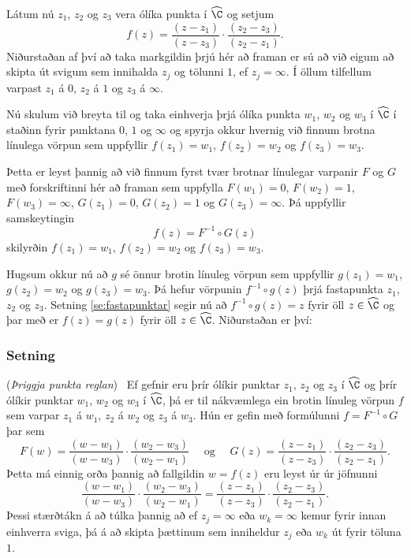 Látum nú $z_1$, $z_2$ og $z_3$ vera ólíka punkta í $\widehat \C$ og
setjum
$$
f(z)=\dfrac{(z-z_1)}{(z-z_3)}\cdot \dfrac{(z_2-z_3)}{(z_2-z_1)}.
$$
Niðurstaðan af því að taka markgildin þrjú hér að framan er sú að við
eigum að skipta  út svigum sem innihalda $z_j$ og tölunni $1$,
ef $z_j=\infty$.  Í öllum tilfellum varpast $z_1$ á $0$, $z_2$ á 
$1$ og $z_3$ á $\infty$.

Nú skulum við breyta til og taka einhverja þrjá ólíka punkta $w_1$,
$w_2$ og $w_3$ í $\widehat \C$  í staðinn fyrir punktana $0$, $1$ 
og $\infty$ og spyrja okkur hvernig við finnum brotna línulega vörpun
sem uppfyllir $f(z_1)=w_1$, $f(z_2)=w_2$ og $f(z_3)=w_3$.  

Þetta er leyst þannig að við finnum fyrst tvær brotnar línulegar
varpanir $F$ og $G$ með forskriftinni hér að framan sem uppfylla
$F(w_1)=0$, $F(w_2)=1$, $F(w_3)=\infty$, $G(z_1)=0$, $G(z_2)=1$ og 
$G(z_3)=\infty$.  Þá uppfyllir samskeytingin
$$
f(z)=F^{-1}\circ G(z)
$$
skilyrðin $f(z_1)=w_1$, $f(z_2)=w_2$ og $f(z_3)=w_3$.  

Hugsum okkur nú að $g$ sé önnur brotin línuleg vörpun 
sem uppfyllir $g(z_1)=w_1$, $g(z_2)=w_2$ og $g(z_3)=w_3$.
Þá hefur vörpunin $f^{-1}\circ g(z)$ þrjá fastapunkta
$z_1$, $z_2$ og $z_3$.   Setning \ref{se:fastapunktar} segir nú að 
$f^{-1}\circ g(z)=z$ fyrir öll $z\in \widehat \C$ og þar með
er $f(z)=g(z)$ fyrir öll $z\in \widehat \C$.  Niðurstaðan er því:

\subsubsection{Setning}\label{se:thrir_punktar} {\rm ({\it Þriggja punkta reglan})} 
\  Ef gefnir eru þrír ólíkir punktar $z_1$, $z_2$ og $z_3$ í $\widehat
\C$ og þrír ólíkir punktar $w_1$, $w_2$ og $w_3$ í $\widehat \C$,
þá er til nákvæmlega ein brotin línuleg vörpun $f$ sem varpar
$z_1$ á $w_1$, $z_2$ á $w_2$ og $z_3$ á $w_3$.  Hún er gefin með
formúlunni $f=F^{-1}\circ G$ þar sem 
$$
F(w)=\dfrac{(w-w_1)}{(w-w_3)}\cdot \dfrac{(w_2-w_3)}{(w_2-w_1)}
\quad \text{ og } \quad 
G(z)=\dfrac{(z-z_1)}{(z-z_3)}\cdot \dfrac{(z_2-z_3)}{(z_2-z_1)}.
$$
Þetta má einnig orða þannig að fallgildin $w=f(z)$ eru leyst úr úr
jöfnunni
$$
\dfrac{(w-w_1)}{(w-w_3)}\cdot \dfrac{(w_2-w_3)}{(w_2-w_1)}
=
\dfrac{(z-z_1)}{(z-z_3)}\cdot \dfrac{(z_2-z_3)}{(z_2-z_1)}.
$$
Þessi stærðtákn á að túlka þannig að ef $z_j=\infty$ eða
$w_k=\infty$ kemur fyrir innan einhverra sviga, þá á að skipta
þættinum sem inniheldur $z_j$ eða $w_k$ út
fyrir töluna $1$.



